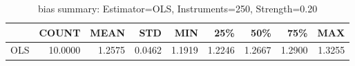 \begin{table}[ht]
\centering
\caption{bias summary: Estimator=OLS, Instruments=250, Strength=0.20}
\begin{tabular}{lrrrrrrrr}
\toprule
 & COUNT & MEAN & STD & MIN & 25\% & 50\% & 75\% & MAX \\
\midrule
OLS & 10.0000 & 1.2575 & 0.0462 & 1.1919 & 1.2246 & 1.2667 & 1.2900 & 1.3255 \\
\bottomrule
\end{tabular}
\end{table}
